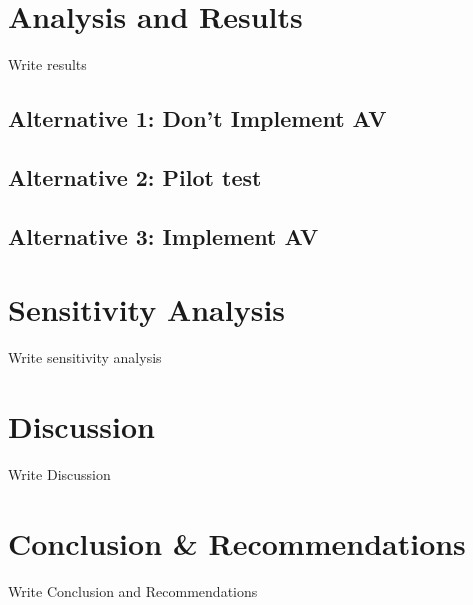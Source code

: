 \documentclass[11pt, letterpaper]{article}
\begin{document}
\section{Analysis and Results} \label{results}

Write results

\subsection{Alternative 1: Don't Implement AV}

\subsection{Alternative 2: Pilot test}

\subsection{Alternative 3: Implement AV}

\section{Sensitivity Analysis} \label{sensitivity}

Write sensitivity analysis

\section{Discussion} \label{discussion}

Write Discussion

\section{Conclusion \& Recommendations} \label{conclusion}

Write Conclusion and Recommendations
\end{document}
